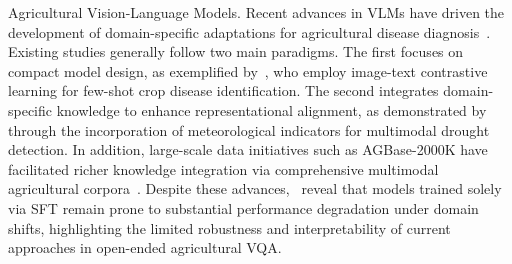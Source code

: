 \documentclass[sigconf,anonymous,review]{acmart}
\begin{document}
Agricultural Vision-Language Models.
Recent advances in VLMs have driven the development of domain-specific adaptations for agricultural disease diagnosis~\cite{zhou2024few,awais2025agrogpt,arshad2025leveraging}. Existing studies generally follow two main paradigms. The first focuses on compact model design, as exemplified by~\citet{cao2025small}, who employ image-text contrastive learning for few-shot crop disease identification. The second integrates domain-specific knowledge to enhance representational alignment, as demonstrated by~\citet{yao2024multimodal} through the incorporation of meteorological indicators for multimodal drought detection. In addition, large-scale data initiatives such as AGBase-2000K have facilitated richer knowledge integration via comprehensive multimodal agricultural corpora~\cite{gauba2025agmmu}. Despite these advances,~\citet{liu2024multimodal} reveal that models trained solely via SFT remain prone to substantial performance degradation under domain shifts, highlighting the limited robustness and interpretability of current approaches in open-ended agricultural VQA.
\end{document}
